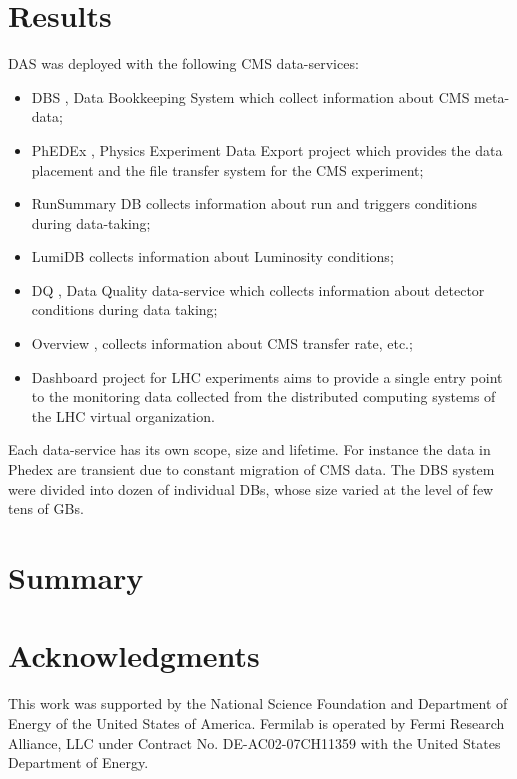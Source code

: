\documentclass[a4paper]{jpconf}
\begin{document}
\section{Results\label{Results}}
DAS was deployed with the following CMS data-services:
\begin{itemize}
\item DBS \cite{DBS}, Data Bookkeeping System which collect information
about CMS meta-data;
\item PhEDEx \cite{Phedex}, Physics Experiment Data Export project which
provides the data placement and the file transfer system for the CMS experiment;
\item RunSummary DB \cite{RunSummary} collects information about run and triggers
conditions during data-taking;
\item LumiDB \cite{LumiDB} collects information about Luminosity conditions;
\item DQ \cite{DQ}, Data Quality data-service which collects information
about detector conditions during data taking;
\item Overview \cite{Overview}, collects information about CMS
transfer rate, etc.;
\item Dashboard \cite{Dashboard} project for LHC experiments aims to 
provide a single entry point to the monitoring data collected from the 
distributed computing systems of the LHC virtual organization.
\end{itemize}
Each data-service has its own scope, size and lifetime. For instance the data
in Phedex are transient due to constant migration of CMS data. The DBS system
were divided into dozen of individual DBs, whose size varied at the level of
few tens of GBs.

\section{Summary}

\section{Acknowledgments}

This work was supported by the National Science Foundation and Department of Energy of the United States of America. Fermilab is operated by Fermi Research Alliance, LLC under Contract
No. DE-AC02-07CH11359 with the United States Department of Energy.
\end{document}
